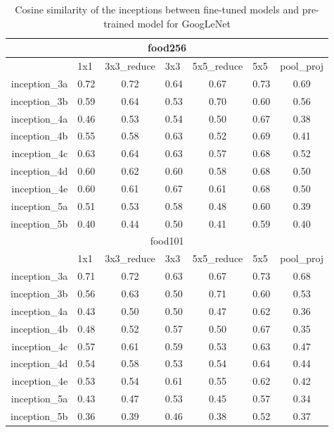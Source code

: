\begin{table}[htbp]
  \centering
  \caption{Cosine similarity of the inceptions between fine-tuned models and pre-trained model for GoogLeNet}
    \begin{tabular}{r|cccccc}
    \toprule
    \multicolumn{7}{c}{food256} \\
    \midrule
          & \multicolumn{1}{l}{1x1} & \multicolumn{1}{l}{3x3\_reduce} & \multicolumn{1}{l}{3x3} & \multicolumn{1}{l}{5x5\_reduce} & \multicolumn{1}{l}{5x5} & \multicolumn{1}{l}{pool\_proj } \\
    inception\_3a & 0.72  & 0.72  & 0.64  & 0.67  & 0.73  & 0.69 \\
    inception\_3b & 0.59  & 0.64  & 0.53  & 0.70  & 0.60  & 0.56 \\
    inception\_4a & 0.46  & 0.53  & 0.54  & 0.50  & 0.67  & 0.38 \\
    inception\_4b & 0.55  & 0.58  & 0.63  & 0.52  & 0.69  & 0.41 \\
    inception\_4c & 0.63  & 0.64  & 0.63  & 0.57  & 0.68  & 0.52 \\
    inception\_4d & 0.60  & 0.62  & 0.60  & 0.58  & 0.68  & 0.50 \\
    inception\_4e & 0.60  & 0.61  & 0.67  & 0.61  & 0.68  & 0.50 \\
    inception\_5a & 0.51  & 0.53  & 0.58  & 0.48  & 0.60  & 0.39 \\
    inception\_5b & 0.40  & 0.44  & 0.50  & 0.41  & 0.59  & 0.40 \\  \toprule
    \multicolumn{7}{c}{food101} \\ \midrule
          & \multicolumn{1}{l}{1x1 } & \multicolumn{1}{l}{3x3\_reduce} & \multicolumn{1}{l}{3x3} & \multicolumn{1}{l}{5x5\_reduce} & \multicolumn{1}{l}{5x5} & \multicolumn{1}{l}{pool\_proj } \\
    inception\_3a & 0.71  & 0.72  & 0.63  & 0.67  & 0.73  & 0.68 \\
    inception\_3b & 0.56  & 0.63  & 0.50  & 0.71  & 0.60  & 0.53 \\
    inception\_4a & 0.43  & 0.50  & 0.50  & 0.47  & 0.62  & 0.36 \\
    inception\_4b & 0.48  & 0.52  & 0.57  & 0.50  & 0.67  & 0.35 \\
    inception\_4c & 0.57  & 0.61  & 0.59  & 0.53  & 0.63  & 0.47 \\
    inception\_4d & 0.54  & 0.58  & 0.53  & 0.54  & 0.64  & 0.44 \\
    inception\_4e & 0.53  & 0.54  & 0.61  & 0.55  & 0.62  & 0.42 \\
    inception\_5a & 0.43  & 0.47  & 0.53  & 0.45  & 0.57  & 0.34 \\
    inception\_5b & 0.36  & 0.39  & 0.46  & 0.38  & 0.52  & 0.37 \\
    \bottomrule
    \end{tabular}%
  \label{tab:cosg}%
\end{table}%


